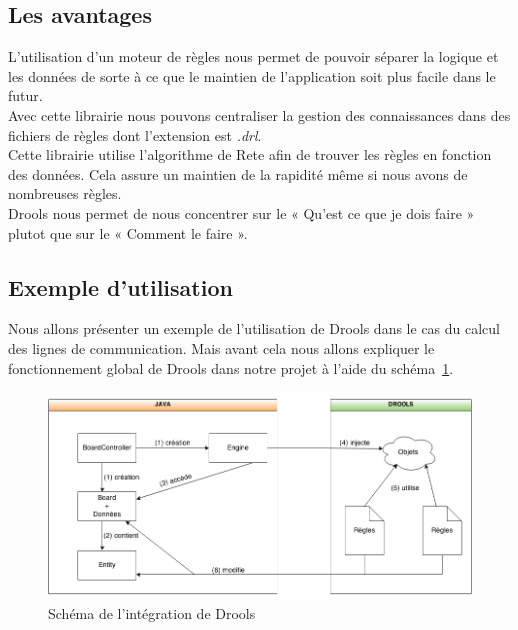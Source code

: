 		\subsection{Les avantages}
			L'utilisation d'un moteur de règles nous permet de pouvoir séparer la logique et les données de sorte à ce que le maintien de l'application soit plus facile dans le futur.
			\\
			Avec cette librairie nous pouvons centraliser la gestion des connaissances dans des fichiers de règles dont l'extension est {\itshape .drl}.
			\\
			Cette librairie utilise l'algorithme de Rete afin de trouver les règles en fonction des données. Cela assure un maintien de la rapidité même si nous avons de nombreuses règles.
			\\
			Drools nous permet de nous concentrer sur le « Qu'est ce que je dois faire » plutot que sur le « Comment le faire ».


		\subsection{Exemple d'utilisation}

			Nous allons présenter un exemple de l'utilisation de Drools dans le cas du calcul des lignes de communication. Mais avant cela nous allons expliquer le fonctionnement global de Drools dans notre projet à l'aide du schéma~\ref{fig:drools_global_utilisation}.		
			\begin{figure}[!h]
			    \caption{Schéma de l'intégration de Drools}
			    \centerline{\includegraphics[scale=0.6]{images/architecture/drools_schema_use.png}}
			    \label{fig:drools_global_utilisation}
			\end{figure} 

